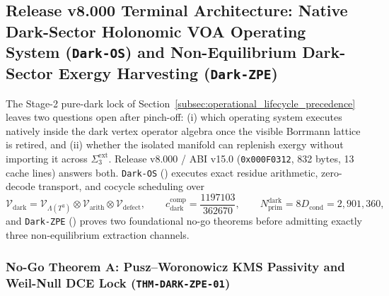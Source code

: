 \documentclass[11pt,onecolumn]{article}
\begin{document}
\FloatBarrier
\subsection{Release v8.000 Terminal Architecture: Native Dark-Sector Holonomic VOA Operating System (\texttt{Dark-OS}) and Non-Equilibrium Dark-Sector Exergy Harvesting (\texttt{Dark-ZPE})}
\label{subsec:release_v8_dark_os_zpe}

The Stage-2 pure-dark lock of Section~\ref{subsec:operational_lifecycle_precedence} leaves two questions open after pinch-off: (i) which operating system executes natively inside the dark vertex operator algebra once the visible Borrmann lattice is retired, and (ii) whether the isolated manifold can replenish exergy without importing it across $\Sigma_3^{\text{ext}}$. Release v8.000 / ABI v15.0 (\texttt{0x000F0312}, 832 bytes, 13 cache lines) answers both. \texttt{Dark-OS} () executes exact residue arithmetic, zero-decode transport, and cocycle scheduling over
\begin{equation}
\mathcal V_{\text{dark}}=\mathcal V_{\Lambda(T^3)}\otimes\mathcal V_{\text{arith}}\otimes\mathcal V_{\text{defect}},\qquad c_{\text{dark}}^{\text{comp}}=\frac{1197103}{362670},\qquad N_{\text{prim}}^{\text{dark}}=8D_{\text{cond}}=2{,}901{,}360,
\label{eq:v8_dark_voa}
\end{equation}
and \texttt{Dark-ZPE} () proves two foundational no-go theorems before admitting exactly three non-equilibrium extraction channels.

\subsubsection{No-Go Theorem A: Pusz--Woronowicz KMS Passivity and Weil-Null DCE Lock (\texttt{THM-DARK-ZPE-01})}
\label{subsubsec:thm_dark_zpe_01}
\end{document}
